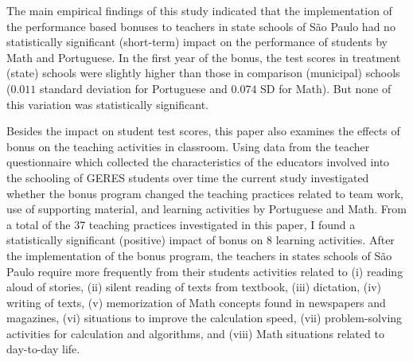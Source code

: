 \documentclass[a4paper, 12pt]{article}
\begin{document}
The main empirical findings of this study indicated that the implementation of the performance based bonuses to teachers in state schools of São Paulo had no statistically significant (short-term) impact on the performance of students by Math and Portuguese. In the first year of the bonus, the test scores in treatment (state) schools were slightly higher than those in comparison (municipal) schools ($0.011$ standard deviation for Portuguese and $0.074$ SD for Math). But none of this variation was statistically significant. %






Besides the impact on student test scores, this paper also examines the effects of bonus on the teaching activities in classroom. Using data from the teacher questionnaire \textemdash which collected the characteristics of the educators involved into the schooling of GERES students over time \textemdash the current study investigated whether the bonus program changed the teaching practices related to team work, use of supporting material, and learning activities by Portuguese and Math. From a total of the 37 teaching practices investigated in this paper, I found a statistically significant (positive) impact of bonus on 8 learning activities. After the implementation of the bonus program, the teachers in states schools of São Paulo require more frequently from their students activities related to (i) reading aloud of stories, (ii) silent reading of texts from textbook, (iii) dictation, (iv) writing of texts, (v) memorization of Math concepts found in newspapers and magazines, (vi) situations to improve the calculation speed, (vii) problem-solving activities for calculation and algorithms, and (viii) Math situations related to day-to-day life.
\end{document}
